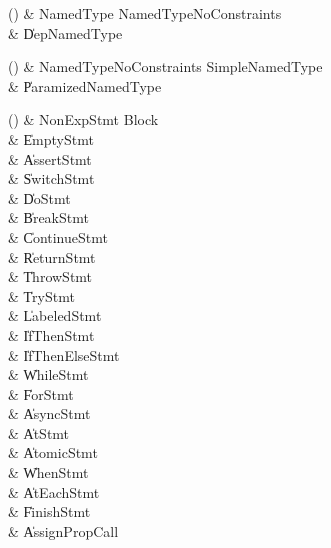 \begin{bbgrammarappendix}{4.1in}

() & NamedType \label{prod:NamedType}  \: NamedTypeNoConstraints  \\

 &    \| DepNamedType \\

\end{bbgrammarappendix}

\begin{bbgrammarappendix}{2.8in}

() & NamedTypeNoConstraints \label{prod:NamedTypeNoConstraints}  \: SimpleNamedType  \\

 &    \| ParamizedNamedType \\

\end{bbgrammarappendix}

\begin{bbgrammarappendix}{4.0in}

() & NonExpStmt \label{prod:NonExpStmt}  \: Block  \\

 &    \| EmptyStmt \\
 &    \| AssertStmt \\
 &    \| SwitchStmt \\
 &    \| DoStmt \\
 &    \| BreakStmt \\
 &    \| ContinueStmt \\
 &    \| ReturnStmt \\
 &    \| ThrowStmt \\
 &    \| TryStmt \\
 &    \| LabeledStmt \\
 &    \| IfThenStmt \\
 &    \| IfThenElseStmt \\
 &    \| WhileStmt \\
 &    \| ForStmt \\
 &    \| AsyncStmt \\
 &    \| AtStmt \\
 &    \| AtomicStmt \\
 &    \| WhenStmt \\
 &    \| AtEachStmt \\
 &    \| FinishStmt \\
 &    \| AssignPropCall \\

\end{bbgrammarappendix}

